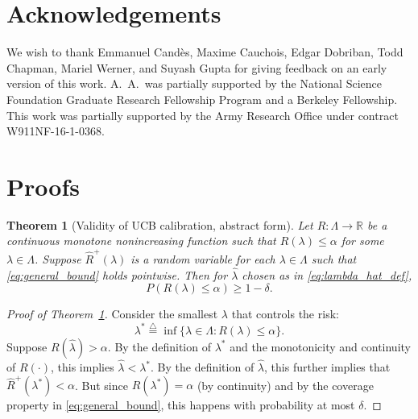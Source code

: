 \documentclass[10pt]{article}
\newtheorem{theorem}{Theorem}
\newcommand{\lhat}{\hat{\lambda}}
\newcommand{\Rhat}{\widehat{R}}
\newcommand{\triangleq}{\stackrel{\triangle}{=}}
\begin{document}
\section*{Acknowledgements}

We wish to thank Emmanuel Cand\`es, Maxime Cauchois, Edgar Dobriban, Todd Chapman, Mariel Werner, and Suyash Gupta for giving feedback on an early version of this work.
A.~A.~was partially supported by the National Science Foundation Graduate Research Fellowship Program and a Berkeley Fellowship. This work was partially supported by the Army Research
Office under contract W911NF-16-1-0368.

\printbibliography

\clearpage
\appendix

\section{Proofs}
\label{app:proofs}

\begin{theorem}[Validity of UCB calibration, abstract form]
    \label{thm:abstract_control_general}
    Let $R : \Lambda \to \mathbb{R}$ be a continuous monotone nonincreasing function such that $R(\lambda) \le \alpha$ for some $\lambda \in \Lambda$.
    Suppose $\Rhat^+(\lambda)$ is a random variable for each $\lambda \in \Lambda$ such that \eqref{eq:general_bound} holds pointwise.
    Then for $\hat{\lambda}$ chosen as in \eqref{eq:lambda_hat_def},
    \begin{equation}
    P\left(R(\lambda) \le \alpha\right) \ge 1 - \delta.
    \end{equation}
\end{theorem}

\begin{proof}[Proof of Theorem~\ref{thm:abstract_control_general}]
Consider the smallest $\lambda$ that controls the risk:
\begin{equation*}
    \lambda^* \triangleq \inf\{\lambda \in \Lambda  : R(\lambda) \le \alpha\}.
\end{equation*}
Suppose $R(\lhat) > \alpha$. By the definition of $\lambda^*$ and the monotonicity and continuity of $R(\cdot)$, this implies
$\lhat < \lambda^*$. By the definition of $\lhat$, this further implies that $\Rhat^+(\lambda^*) < \alpha$. But since $R(\lambda^*) = \alpha$ (by continuity) and by the coverage property in \eqref{eq:general_bound}, this happens with probability at most $\delta$.
\end{proof}
\end{document}

